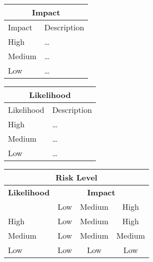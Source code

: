 \documentclass{article}
\begin{document}

\begin{center}
\begin{tabular}{|l|l|}
\hline
\multicolumn{2}{|c|}{\bf Impact} \\
\hline
Impact & Description \\
\hline
\hline
High   & \hspace*{20pt}\ldots \\
\hline
Medium & \hspace*{20pt}\ldots \\
\hline
Low   & \hspace*{20pt}\ldots \\
\hline
\end{tabular}
%
%
\begin{tabular}{|l|l|}
\hline
\multicolumn{2}{|c|}{\bf Likelihood} \\
\hline
Likelihood & Description \\
\hline
\hline
High   & \hspace*{20pt}\ldots \\
\hline
Medium & \hspace*{20pt}\ldots \\
\hline
Low   & \hspace*{20pt}\ldots \\
\hline
\end{tabular}
\end{center}

\vspace{5mm}

\begin{center}
\begin{tabular}{|l|c|c|c|}
\hline
\multicolumn{4}{|c|}{{\bf Risk Level}} \\
\hline
{{\bf Likelihood}} & \multicolumn{3}{c|}{{\bf Impact}} \\ %
     & Low & Medium & High \\  \hline
 High & Low & Medium & High  \\
\hline
 Medium & Low & Medium & Medium \\
\hline
 Low & Low & Low & Low \\
\hline
\end{tabular}
\end{center}
\end{document}
